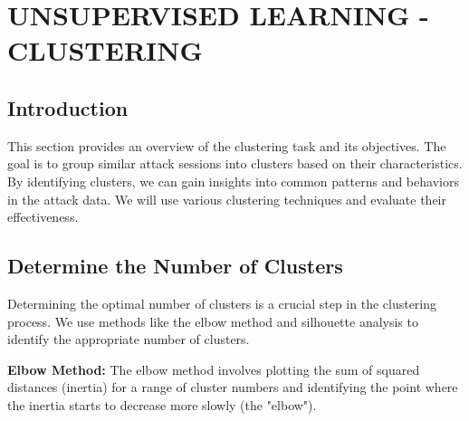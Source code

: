 

\section{UNSUPERVISED LEARNING - CLUSTERING}


    \subsection{Introduction}
    
        This section provides an overview of the clustering task and its objectives. The goal is to group similar attack sessions into clusters based on their characteristics. By identifying clusters, we can gain insights into common patterns and behaviors in the attack data. We will use various clustering techniques and evaluate their effectiveness.

    \subsection{Determine the Number of Clusters}
    
        Determining the optimal number of clusters is a crucial step in the clustering process. We use methods like the elbow method and silhouette analysis to identify the appropriate number of clusters.

        \textbf{Elbow Method:} The elbow method involves plotting the sum of squared distances (inertia) for a range of cluster numbers and identifying the point where the inertia starts to decrease more slowly (the "elbow").
        
        \vspace{0.5em}

